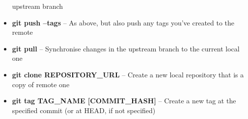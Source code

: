 \documentclass[9pt]{extarticle}
\begin{document}
\begin{bluebox}[title=Git Command Cheat Sheet]
\begin{itemize}
    upstream branch
  \item \textbf{git push --tags} -- As above, but also push any tags you've created to
    the remote
  \item \textbf{git pull} -- Synchronise changes in the upstream branch to the current
    local one
  \item \textbf{git clone REPOSITORY\_URL} -- Create a new local repository that is a
    copy of remote one
  \item \textbf{git tag TAG\_NAME [COMMIT\_HASH]} -- Create a new tag at the specified
    commit (or at HEAD, if not specified)
  \end{itemize}
\end{bluebox}


\furtherhelp
\end{document}
